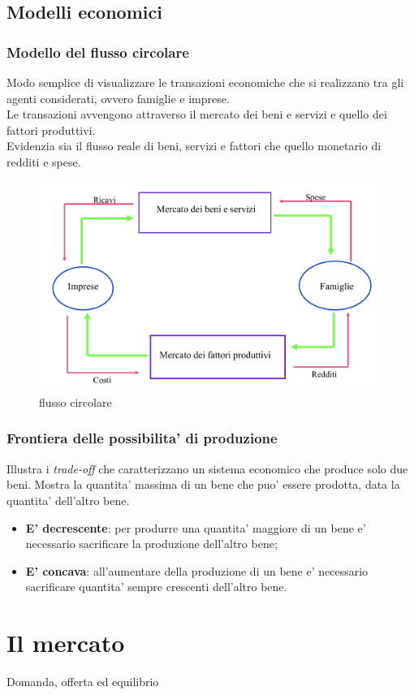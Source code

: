 \documentclass{report}
\begin{document}
	\section{Modelli economici}
	\subsection{Modello del flusso circolare}
	Modo semplice di visualizzare le transazioni economiche che si realizzano tra gli agenti considerati, ovvero famiglie e imprese.\medskip \\Le transazioni avvengono attraverso il mercato dei beni e servizi e quello dei fattori produttivi.\medskip \\Evidenzia sia il flusso reale di beni, servizi e fattori che quello monetario di redditi e spese.
	\begin{figure}[h]
		\centering
		\includegraphics[width=0.7\linewidth]{flusso-circolare}
		\caption{flusso circolare}
		\label{fig:flusso-circolare}
	\end{figure}
	\subsection{Frontiera delle possibilita' di produzione}
	Illustra i \textit{trade-off} che caratterizzano un sistema economico che produce solo due beni. Mostra la quantita' massima di un bene che puo' essere prodotta, data la quantita' dell'altro bene.
	\begin{itemize}
		\item \textbf{E' decrescente}: per produrre una quantita' maggiore di un bene e' necessario sacrificare la produzione dell'altro bene;
		\item \textbf{E' concava}: all'aumentare della produzione di un bene e' necessario sacrificare quantita' sempre crescenti dell'altro bene.
	\end{itemize}
	\chapter{Il mercato}
	\large Domanda, offerta ed equilibrio
\end{document}
